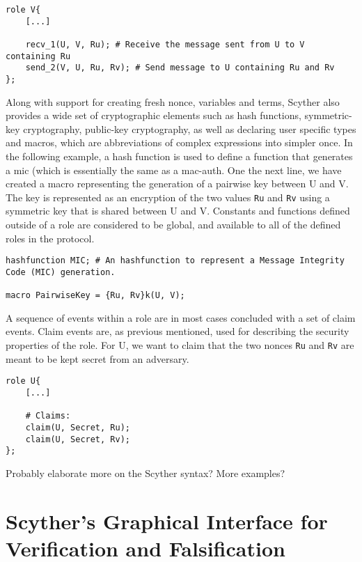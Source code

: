 \begin{lstlisting}
role V{
	[...]
	
	recv_1(U, V, Ru); # Receive the message sent from U to V containing Ru
	send_2(V, U, Ru, Rv); # Send message to U containing Ru and Rv
};
\end{lstlisting}


Along with support for creating fresh nonce, variables and terms, Scyther also provides a wide set of cryptographic elements such as hash functions, symmetric-key cryptography, public-key cryptography, as well as declaring user specific types and macros, which are abbreviations of complex expressions into simpler once. In the following example, a hash function is used to define a function that generates a \gls{mic} (which is essentially the same as a \gls{mac-auth}. One the next line, we have created a macro representing the generation of a pairwise key between U and V. The key is represented as an encryption of the two values \texttt{Ru} and \texttt{Rv} using a symmetric key that is shared between U and V. Constants and functions defined outside of a role are considered to be global, and available to all of the defined roles in the protocol.

\begin{lstlisting}
hashfunction MIC; # An hashfunction to represent a Message Integrity Code (MIC) generation.

macro PairwiseKey = {Ru, Rv}k(U, V);
\end{lstlisting}




A sequence of events within a role are in most cases concluded with a set of claim events. Claim events are, as previous mentioned, used for describing the security properties of the role. For U, we want to claim that the two nonces \texttt{Ru} and \texttt{Rv} are meant to be kept secret from an adversary.


\begin{lstlisting}
role U{
	[...]
	
	# Claims:
	claim(U, Secret, Ru);
	claim(U, Secret, Rv);
};
\end{lstlisting}


Probably elaborate more on the Scyther syntax? More examples? 

\section{Scyther's Graphical Interface for Verification and Falsification}

